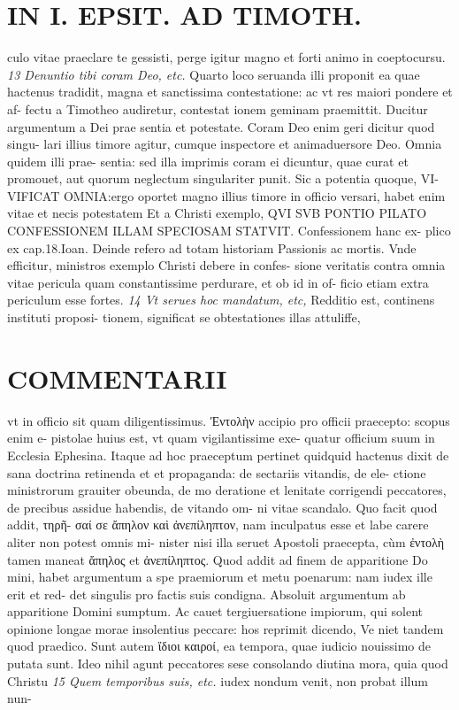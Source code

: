 \documentclass{article}
\begin{document}
\begin{pages}
\section*{IN I. EPSIT. AD TIMOTH. }
\marginpar{[ p.163 ]}\pstart culo vitae praeclare te gessisti, perge igitur magno et forti animo in coeptocursu.  \pend
\textit{13 Denuntio tibi coram Deo, etc. }\pstart Quarto loco seruanda illi proponit ea quae hactenus tradidit, magna et sanctissima contestatione: ac vt res maiori pondere et af- fectu a Timotheo audiretur, contestat ionem geminam praemittit. Ducitur argumentum a Dei prae sentia et potestate.  \pend\pstart Coram Deo enim geri dicitur quod singu- lari illius timore agitur, cumque inspectore et animaduersore Deo. Omnia quidem illi prae- sentia: sed illa imprimis coram ei dicuntur, quae curat et promouet, aut quorum neglectum singulariter punit. Sic a potentia quoque, VI- VIFICAT OMNIA:ergo oportet magno illius timore in officio versari, habet enim vitae et necis potestatem Et a Christi exemplo, QVI SVB PONTIO PILATO CONFESSIONEM ILLAM SPECIOSAM STATVIT. Confessionem hanc ex- plico ex cap.18.Ioan. Deinde refero ad totam historiam Passionis ac mortis. Vnde efficitur, ministros exemplo Christi debere in confes- sione veritatis contra omnia vitae pericula quam constantissime perdurare, et ob id in of- ficio etiam extra periculum esse fortes.  \pend
\textit{14 Vt serues hoc mandatum, etc, }\pstart Redditio est, continens instituti proposi- tionem, significat se obtestationes illas attuliffe,  \pend
\marginpar{[ p.164 ]}
\section*{COMMENTARII }\pstart vt in officio sit quam diligentissimus. Ἐντολὴν accipio pro officii praecepto: scopus enim e- pistolae huius est, vt quam vigilantissime exe- quatur officium suum in Ecclesia Ephesina. Itaque ad hoc praeceptum pertinet quidquid hactenus dixit de sana doctrina retinenda et et propaganda: de sectariis vitandis, de ele- ctione ministrorum grauiter obeunda, de mo deratione et lenitate corrigendi peccatores, de precibus assidue habendis, de vitando om- ni vitae scandalo. Quo facit quod addit, τηρῆ- σαί σε ἄπηλον καὶ ἀνεπίληπτον, nam inculpatus esse et labe carere aliter non potest omnis mi- nister nisi illa seruet Apostoli praecepta, cùm ἐντολὴ tamen maneat ἄπηλος et ἀνεπίληπτος. Quod addit ad finem de apparitione Do mini, habet argumentum a spe praemiorum et metu poenarum: nam iudex ille erit et red- det singulis pro factis suis condigna. Absoluit argumentum ab apparitione Domini sumptum. Ac cauet tergiuersatione impiorum, qui solent opinione longae morae insolentius peccare: hos reprimit dicendo, Ve niet tandem quod praedico. Sunt autem ἵδιοι καιροί, ea tempora, quae iudicio nouissimo de putata sunt. Ideo nihil agunt peccatores sese consolando diutina mora, quia quod Christu  \pend
\textit{15 Quem temporibus suis, etc. }\pstart iudex nondum venit, non probat illum nun-  \pend

\end{pages}
\end{document}
